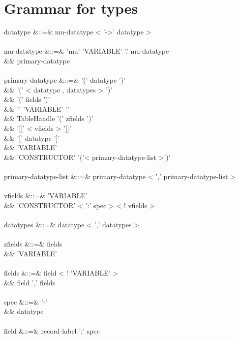 \documentclass[11pt,a4paper]{article}
\begin{document}
\section{Grammar for types}

\begin{grammar}
datatype &::=& mu-datatype < '->' datatype > \\
\\
mu-datatype &::=& 'mu' 'VARIABLE' '.' mu-datatype \\
&&                primary-datatype \\
\\
primary-datatype &::=& '(' datatype ')' \\
&&                     '(' < datatype , datatypes > ')' \\
&&                     '(' fields ')' \\
&&                     '{' 'VARIABLE' '}' \\
&&                     TableHandle '(' zfields ')' \\
&&                     '[[' < vfields > ']]' \\
&&                     '[' datatype ']' \\
&&                     'VARIABLE' \\
&&                     'CONSTRUCTOR' '('< primary-datatype-list >')' \\
\\
primary-datatype-list &::=& primary-datatype < ',' primary-datatype-list > \\
\\
vfields &::=&  'VARIABLE'  \\
&&             'CONSTRUCTOR' < ':' spec >  < ! vfields > \\
\\
datatypes &::=& datatype < ',' datatypes > \\
\\
zfields &::=& fields \\
&&            'VARIABLE' \\
\\
fields &::=&  field < ! 'VARIABLE' >  \\
&&            field ',' fields \\
\\
spec &::=& '-' \\
&&         datatype \\
\\
field &::=& record-label ':' spec \\
\end{grammar}
\end{document}
